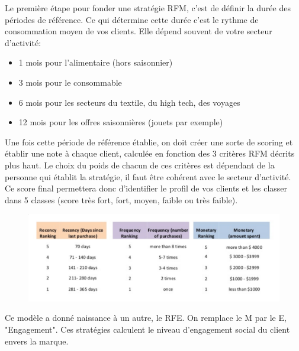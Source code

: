 Le première étape pour fonder une stratégie RFM, c'est de définir la durée des périodes de référence. Ce qui détermine cette durée c'est le rythme de consommation moyen de vos clients. Elle dépend souvent de votre secteur d'activité:

\begin{itemize}
    \item 1 mois pour l'alimentaire (hors saisonnier)
    \item 3 mois pour le consommable
    \item 6 mois pour les secteurs du textile, du high tech, des voyages
    \item 12 mois pour les offres saisonnières (jouets par exemple)\\
\end{itemize}

Une fois cette période de référence établie, on doit créer une sorte de scoring et établir une note à chaque client, calculée en fonction des 3 critères RFM décrits plus haut. Le choix du poids de chacun de ces critères est dépendant de la personne qui établit la stratégie, il faut être cohérent avec le secteur d'activité. Ce score final permettera donc d'identifier le profil de vos clients et les classer dans 5 classes (score très fort, fort, moyen, faible ou très faible).

\begin{figure}[H]
\centering
\includegraphics[scale=0.22]{../images/lec5img1}
\end{figure}

Ce modèle a donné naissance à un autre, le RFE. On remplace le M par le E, "Engagement". Ces stratégies calculent le niveau d'engagement social du client envers la marque.
